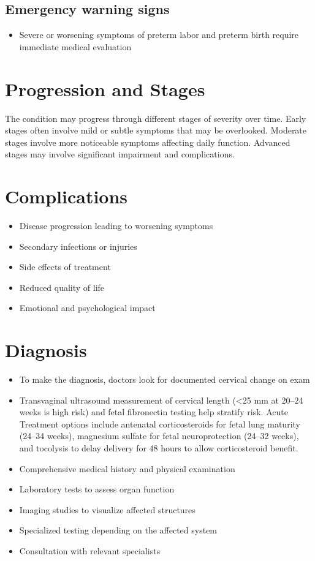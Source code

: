 \subsection{Emergency warning signs}
\begin{itemize}[noitemsep]
  \item Severe or worsening symptoms of preterm labor and preterm birth require immediate medical evaluation
\end{itemize}
\section{Progression and Stages}
The condition may progress through different stages of severity over time. Early stages often involve mild or subtle symptoms that may be overlooked. Moderate stages involve more noticeable symptoms affecting daily function. Advanced stages may involve significant impairment and complications.
\section{Complications}
\begin{itemize}[noitemsep]
  \item Disease progression leading to worsening symptoms
  \item Secondary infections or injuries
  \item Side effects of treatment
  \item Reduced quality of life
  \item Emotional and psychological impact
\end{itemize}
\section{Diagnosis}
\begin{itemize}[noitemsep]
  \item To make the diagnosis, doctors look for documented cervical change on exam
  \item Transvaginal ultrasound measurement of cervical length (<25 mm at 20--24 weeks is high risk) and fetal fibronectin testing help stratify risk. Acute Treatment options include antenatal corticosteroids for fetal lung maturity (24--34 weeks), magnesium sulfate for fetal neuroprotection (24--32 weeks), and tocolysis to delay delivery for 48 hours to allow corticosteroid benefit.
  \item Comprehensive medical history and physical examination
  \item Laboratory tests to assess organ function
  \item Imaging studies to visualize affected structures
  \item Specialized testing depending on the affected system
  \item Consultation with relevant specialists
\end{itemize}
